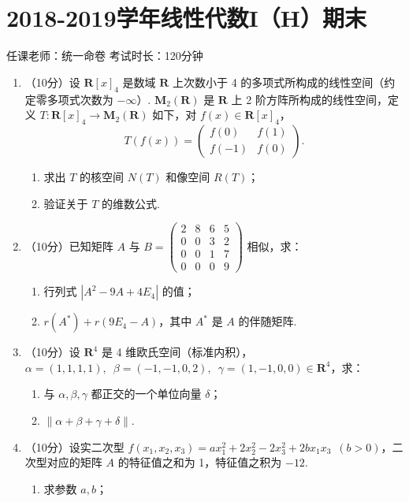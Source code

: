 \section{2018-2019学年线性代数I（H）期末}

\begin{center}
    任课老师：统一命卷\hspace{4em} 考试时长：120分钟
\end{center}

\begin{enumerate}
    \item （10分）设 $\mathbf{R}[x]_4$ 是数域 $\mathbf{R}$ 上次数小于 4 的多项式所构成的线性空间（约定零多项式次数为 $-\infty$）. $\mathbf{M}_2(\mathbf{R})$ 是 $\mathbf{R}$ 上 2 阶方阵所构成的线性空间，定义 $T \colon \mathbf{R}[x]_4 \to \mathbf{M}_2(\mathbf{R})$ 如下，对 $f(x) \in \mathbf{R}[x]_4$，
    \[T(f(x))=\begin{pmatrix}f(0) & f(1) \\ f(-1) & f(0)\end{pmatrix}.\]
    \begin{enumerate}
        \item 求出 $T$ 的核空间 $N(T)$ 和像空间 $R(T)$；

        \item 验证关于 $T$ 的维数公式.
    \end{enumerate}
	\item （10分）已知矩阵 $A$ 与 $B=\begin{pmatrix}2 & 8 & 6 & 5 \\ 0 & 0 & 3 & 2 \\ 0 & 0 & 1 & 7 \\ 0 & 0 & 0 & 9\end{pmatrix}$ 相似，求：
    \begin{enumerate}
        \item 行列式 $|A^2-9A+4E_4|$ 的值；

        \item $r(A^*)+r(9E_4-A)$，其中 $A^*$ 是 $A$ 的伴随矩阵.
    \end{enumerate}
	\item （10分）设 $\mathbf{R}^4$ 是 4 维欧氏空间（标准内积），$\alpha=(1,1,1,1),\enspace\allowbreak\beta=(-1,-1,0,2),\enspace\allowbreak\gamma=(1,-1,0,0) \in \mathbf{R}^4$，求：
    \begin{enumerate}
        \item 与 $\alpha,\beta,\gamma$ 都正交的一个单位向量 $\delta$；

        \item $\lVert \alpha+\beta+\gamma+\delta \rVert$.
    \end{enumerate}
	\item （10分）设实二次型 $f(x_1,x_2,x_3)=ax_1^2+2x_2^2-2x_3^2+2bx_1x_3\enspace(b > 0)$，二次型对应的矩阵 $A$ 的特征值之和为 1，特征值之积为 $-12$.
    \begin{enumerate}
        \item 求参数 $a,b$；


\end{enumerate}
\end{enumerate}
